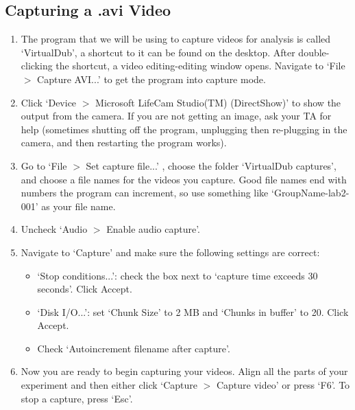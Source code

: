 \subsection{Capturing a .avi Video}
\begin{enumerate}
\item The program that we will be using to capture videos for analysis is called `VirtualDub', a shortcut to it can be found on the desktop. After double-clicking the shortcut, a video editing-editing window opens. Navigate to `File $>$ Capture AVI...' to get the program into capture mode.
\item Click `Device $>$ Microsoft LifeCam Studio(TM) (DirectShow)' to show the output from the camera. If you are not getting an image, ask your TA for help (sometimes shutting off the program, unplugging then re-plugging in the camera, and then restarting the program works).
\item Go to `File $>$ Set capture file...' , choose the folder `VirtualDub captures', and choose a file names for the videos you capture. Good file names end with numbers the program can increment, so use something like `GroupName-lab2-001' as your file name.
\item Uncheck `Audio $>$ Enable audio capture'.
\item Navigate to `Capture' and make sure the following settings are correct:
\begin{itemize}
	\item `Stop conditions...': check the box next to `capture time exceeds 30 seconds'. Click Accept.
	\item `Disk I/O...': set `Chunk Size' to 2 MB and `Chunks in buffer' to 20. Click Accept.
	\item Check `Autoincrement filename after capture'.
\end{itemize}
\item Now you are ready to begin capturing your videos. Align all the parts of your experiment and then either click `Capture $>$ Capture video' or press `F6'. To stop a capture, press `Esc'.
\end{enumerate}

\begin{table}[h]
\centering
{}
\caption{Viscosity of glycerol concentrations by \% volume}
\label{tab:viscosity}
\end{table}

